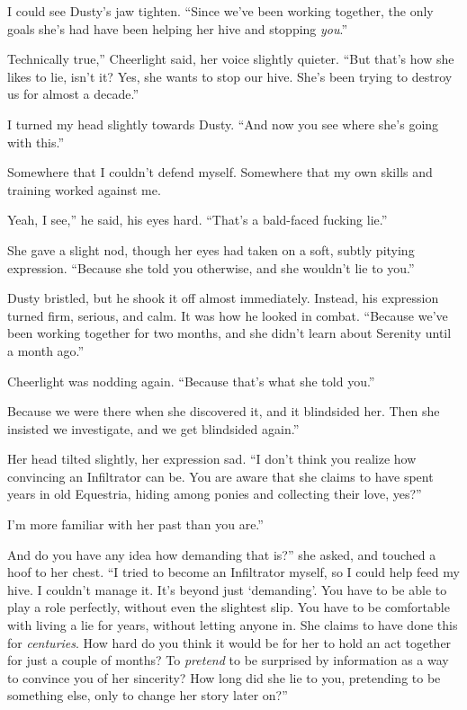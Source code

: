 I could see Dusty’s jaw tighten. “Since we’ve been working together, the only goals she’s had have been helping her hive and stopping \textit{you}.”

\leavevmode{}Technically true,” Cheerlight said, her voice slightly quieter. “But that’s how she likes to lie, isn’t it? Yes, she wants to stop our hive. She’s been trying to destroy us for almost a decade.”

I turned my head slightly towards Dusty. “And now you see where she’s going with this.”

Somewhere that I couldn’t defend myself. Somewhere that my own skills and training worked against me.

\leavevmode{}Yeah, I see,” he said, his eyes hard. “That’s a bald-faced fucking lie.”

She gave a slight nod, though her eyes had taken on a soft, subtly pitying expression. “Because she told you otherwise, and she wouldn’t lie to you.”

Dusty bristled, but he shook it off almost immediately. Instead, his expression turned firm, serious, and calm. It was how he looked in combat. “Because we’ve been working together for two months, and she didn’t learn about Serenity until a month ago.”

Cheerlight was nodding again. “Because that’s what she told you.”

\leavevmode{}Because we were there when she discovered it, and it blindsided her. Then she insisted we investigate, and we get blindsided again.”

Her head tilted slightly, her expression sad. “I don’t think you realize how convincing an Infiltrator can be. You are aware that she claims to have spent years in old Equestria, hiding among ponies and collecting their love, yes?”

\leavevmode{}I’m more familiar with her past than you are.”

\leavevmode{}And do you have any idea how demanding that is?” she asked, and touched a hoof to her chest. “I tried to become an Infiltrator myself, so I could help feed my hive. I couldn’t manage it. It’s beyond just ‘demanding’. You have to be able to play a role perfectly, without even the slightest slip. You have to be comfortable with living a lie for years, without letting anyone in. She claims to have done this for \textit{centuries}. How hard do you think it would be for her to hold an act together for just a couple of months? To \textit{pretend} to be surprised by information as a way to convince you of her sincerity? How long did she lie to you, pretending to be something else, only to change her story later on?”

